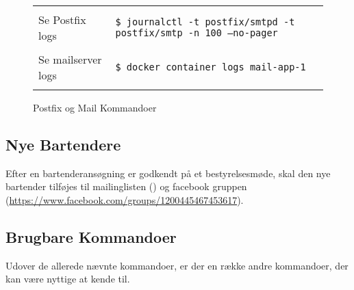 \begin{figure}[H]
\begin{tabular}{l l}
        & \\
        \begin{minipage}
            {0.5\textwidth}
            Se Postfix logs
        \end{minipage}&
        \begin{minipage}
            {0.5\textwidth}
            \texttt{\$ journalctl  -t postfix/smtpd -t postfix/smtp -n 100 --no-pager}
        \end{minipage} \\
        & \\
        \begin{minipage}
            {0.5\textwidth}
            Se mailserver logs
        \end{minipage}&
        \begin{minipage}
            {0.5\textwidth}
            \texttt{\$ docker container logs mail-app-1}
        \end{minipage} \\
        & \\
    \end{tabular}
    \caption{Postfix og Mail Kommandoer}
    \label{fig:postfix-kommandoer}
\end{figure}

\subsection{Nye Bartendere}
\label{sec:nye-bartendere}

Efter en bartenderansøgning er godkendt på et bestyrelsesmøde, skal den nye bartender tilføjes til
mailinglisten (\allemail) og facebook gruppen 
(\url{https://www.facebook.com/groups/1200445467453617}).

\subsection{Brugbare Kommandoer}
\label{sec:brugbare-kommandoer}

Udover de allerede nævnte kommandoer, er der en række andre kommandoer, der kan være nyttige at kende til.

